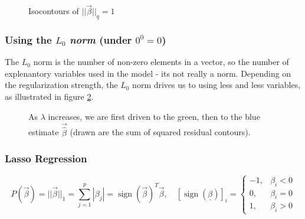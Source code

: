 \begin{figure}[!htb]
    \centering
    
    \caption{Isocontours of $||\vec{\beta}||_q = 1$}
    \label{fig:penalty_norms}
\end{figure}

\subsubsection{Using the $L_0$ \textit{norm} (under $0^0 = 0$)}
The $L_0$ norm is the number of non-zero elements in a vector, so the 
number of explenantory variables used in the model - its not really a norm. Depending on 
the regularization strength, the $L_0$ norm drives us to using
less and less variables, as illustrated in figure \ref{fig:l0_norm_reg}.

\begin{figure}[!htb]
    \centering
    
    \caption{As $\lambda$ increases, we are first driven to the green, then to the blue estimate $\vec{\hat{\beta}}$ (drawn
    are the sum of squared residual contours).}
    \label{fig:l0_norm_reg}
\end{figure}


\subsubsection{Lasso Regression}
\begin{equation}
    P(\vec{\beta}) = || \vec{\beta} ||_1 = \sum_{j=1}^p |\beta_j| = \operatorname{sign}(\vec{\beta})^T \vec{\beta}, \quad [\operatorname{sign}(\underline{\beta})]_i= \begin{cases}-1, & \beta_i<0 \\ 0, & \beta_i=0 \\ 1, & \beta_i>0\end{cases}
\end{equation}


